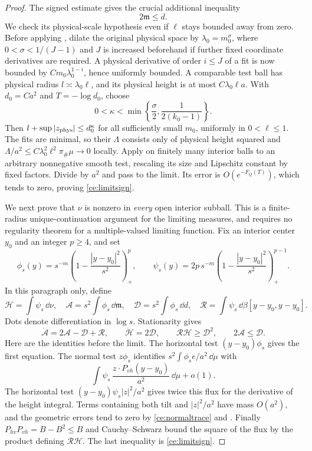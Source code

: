 \begin{proof}
The signed estimate gives the crucial additional inequality
\begin{equation}
 \label{ce:limitsign}
 2\mathfrak m\le d.
\end{equation}
We check its physical-scale hypothesis even if $\ell$ stays bounded
away from zero.  Before applying , dilate the original
physical space by $\lambda_0=m_0^\sigma$, where
$0<\sigma<1/(J-1)$ and $J$ is increased beforehand if further fixed
coordinate derivatives are required.  A physical derivative of order
$i\le J$ of a fit is now bounded by
$Cm_0\lambda_0^{1-i}$, hence uniformly bounded.  A comparable test
ball has physical radius $l\asymp\lambda_0\ell$, and its physical
height is at most $C\lambda_0\ell a$.  With $d_0=Ca^2$ and
$T=-\log d_0$, choose
\begin{equation}
 \label{ce:physicalparameters}
 0<\kappa<\min\left\{\frac\sigma2,
                          \frac1{2(k_0-1)}\right\}.
\end{equation}
Then $l+\sup|z_{\rm phys}|\le d_0^\kappa$ for all sufficiently
small $m_0$, uniformly in $0<\ell\le1$.  The fits are minimal, so
their $\Lambda$ consists only of physical height squared and
$\Lambda/a^2\le C\lambda_0^2\ell^2\pi_\#\mu\to0$ locally.
Apply  on finitely many interior balls to an arbitrary
nonnegative smooth test, rescaling its size and Lipschitz constant by
fixed factors.  Divide by $a^2$ and pass to the limit.  Its error is
$O(e^{-F_Q(T)})$, which tends to zero, proving \eqref{ce:limitsign}.

We next prove that $\nu$ is nonzero in \emph{every} open interior
subball.  This is a finite-radius unique-continuation argument for
the limiting measures, and requires no regularity theorem for a
multiple-valued limiting function.  Fix an interior center $y_0$ and
an integer $p\ge4$, and set
\[
 \phi_s(y)=s^{-m}\left(1-\frac{|y-y_0|^2}{s^2}\right)_+^p,
 \qquad
 \psi_s(y)=2p\,s^{-m}\left(1-\frac{|y-y_0|^2}{s^2}\right)_+^{p-1}.
\]
In this paragraph only, define
\[
 \mathcal H=\int\psi_s\,\dd\nu,
 \quad \mathcal A=s^2\int\phi_s\,\dd\mathfrak m,
 \quad \mathcal D=s^2\int\phi_s\,\dd d,
 \quad \mathcal R=\int\psi_s\,\dd\beta[y-y_0,y-y_0].
\]
Dots denote differentiation in $\log s$.  Stationarity gives
\begin{equation}
 \label{ce:limitidentities}
 \dot{\mathcal A}=2\mathcal A-\mathcal D+\mathcal R,
 \qquad \dot{\mathcal H}=2\mathcal D,
 \qquad \mathcal R\mathcal H\ge\mathcal D^2,
 \qquad 2\mathcal A\le\mathcal D.
\end{equation}
Here are the identities before the limit.  The horizontal test
$(y-y_0)\phi_s$ gives the first equation.  The normal test $z\phi_s$
identifies $s^2\int\phi_s e/a^2\,\dd\mu$ with
\[
 \int\psi_s\,\frac{z\cdot P_{vh}(y-y_0)}{a^2}\,\dd\mu+o(1).
\]
The horizontal test $(y-y_0)\psi_s|z|^2/a^2$ gives twice this flux
for the derivative of the height integral.  Terms containing both
tilt and $|z|^2/a^2$ have mass $O(a^2)$, and the geometric errors tend
to zero by \eqref{ce:normaltrace} and .
Finally $P_{hv}P_{vh}=B-B^2\le B$ and Cauchy--Schwarz bound the square
of the flux by the product defining $\mathcal R\mathcal H$.
The last inequality is \eqref{ce:limitsign}.


\end{proof}
